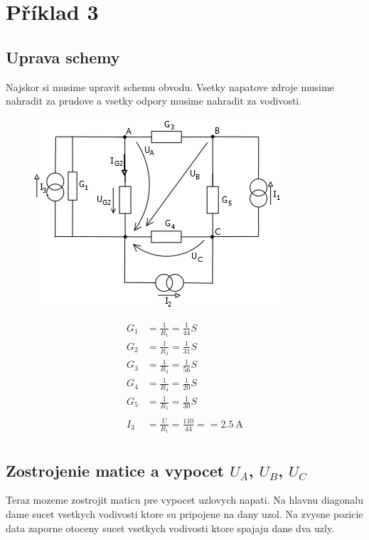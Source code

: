 \section{Příklad 3}

\subsection{Uprava schemy}
Najskor si musime upravit schemu obvodu. Vsetky napatove zdroje musime nahradit za prudove a vsetky odpory musime nahradit za vodivosti.

\begin{figure}[!h]
    \centering
    \includegraphics[width=0.5\linewidth]{pr3/1.png}
\end{figure}

\begin{align*}
    G_1 &= \frac{1}{R_1} = \frac{1}{44} S \\
    G_2 &= \frac{1}{R_2} = \frac{1}{31} S\\
    G_3 &= \frac{1}{R_3} = \frac{1}{56} S\\
    G_4 &= \frac{1}{R_4} = \frac{1}{20} S \\
    G_5 &= \frac{1}{R_5} = \frac{1}{30} S \\
    \\
    I_3 &= \frac{U}{R_1} = \frac{110}{44} == \SI{2.5}{\ampere}\\
\end{align*}

\subsection{Zostrojenie matice a vypocet $U_A$, $U_B$, $U_C$}
Teraz mozeme zostrojit maticu pre vypocet uzlovych napati.
Na hlavnu diagonalu dame sucet vsetkych vodivosti ktore su pripojene na dany uzol. 
Na zvysne pozicie data zaporne otoceny sucet vsetkych vodivosti ktore spajaju dane dva uzly.

